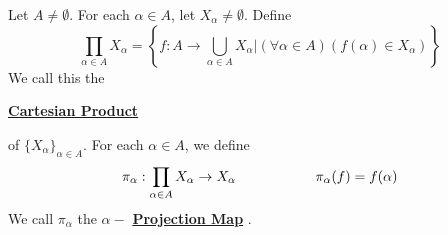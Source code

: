 \newcommand{\InfiniteCartesianProduct}[0]{
    \textbf{\hyperref[def:InfiniteCartesianProduct]{Cartesian Product}}
}
\newcommand{\InfiniteCartesianProducts}[0]{
    \textbf{\hyperref[def:InfiniteCartesianProduct]{Cartesian Products}}
}
\newcommand{\scCartesianProduct}[3]{
    \ensuremath{\prod\limits_{#1 \in #2}#3_{#1}}
}
\newcommand{\ProjectionMap}[0]{
    \textbf{\hyperref[def:InfiniteCartesianProduct]{Projection Map}}
}\begin{df}
\label{def:InfiniteCartesianProduct}
\rm
    Let $A \neq \emptyset$. 
    For each $\alpha \in A$, let 
    $X_{\alpha} \neq \emptyset$. 
    Define 
    \begin{equation*}
        \prod\limits_{\alpha \in A} X_{\alpha } = \left\{f:A \to \bigcup\limits_{\alpha \in A} X_{\alpha} | (\forall \alpha \in A)(f(\alpha) \in X_{\alpha} ) \right\}
    \end{equation*}
    We call this the 
    \InfiniteCartesianProduct
    of $\{X_\alpha\}_{\alpha \in A}$. 
    For each $\alpha \in A$, we define 
    \begin{equation*}
        \pi_\alpha : \scCartesianProduct{\alpha}{A}{X} \to X_{\alpha }\tab[2cm] \pi_\alpha(f) = f(\alpha)
    \end{equation*}
    We call $\pi_\alpha$ the
    $\alpha-$\ProjectionMap.
\end{df}
